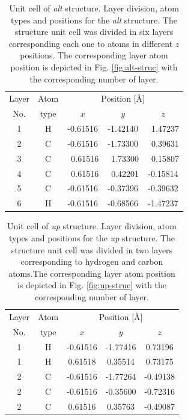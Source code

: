 \documentclass[prb,11pt,tightenlines,twocolumn,aps]{revtex4-1}
\begin{document}
\begin{table}[t]
\center
\begin{tabular}{ccccc}\\
\hline
\quad Layer \quad & \quad Atom \qquad & \multicolumn{3}{c}{Position [\AA]} \\
\cline{3-5}
\quad No.   \quad & \quad type \qquad & $x$ & $y$ & $z$  \\
\hline
1 & H &  -0.61516 &  -1.42140 & \ 1.47237 \\
2 & C &  -0.61516 &  -1.73300 & \ 0.39631 \\
3 & C & \ 0.61516 & \ 1.73300 & \ 0.15807 \\
4 & C & \ 0.61516 & \ 0.42201 &  -0.15814 \\
5 & C &  -0.61516 &  -0.37396 &  -0.39632 \\
6 & H &  -0.61516 &  -0.68566 &  -1.47237 \\
\hline
\end{tabular}

\caption{Unit cell of \emph{alt} structure. Layer division, atom types and
positions for the \emph{alt} structure. The structure unit cell was divided in
six layers corresponding each one to atoms in different $z$ positions. The
corresponding layer atom position is depicted in Fig. \ref{fig:alt-struc} with
the corresponding number of layer.}
\label{tab:alt-unitcell}
\end{table}
% 
\begin{table}[t]
\center
\begin{tabular}{ccccc}\\
\hline
\quad Layer \quad & \quad Atom \qquad & \multicolumn{3}{c}{Position [\AA]} \\
\cline{3-5}
\quad No.   \quad & \quad type \qquad & $x$ & $y$ & $z$  \\
\hline
1 & H & -0.61516 & -1.77416 &  0.73196 \\
1 & H &  0.61518 &  0.35514 &  0.73175 \\
2 & C & -0.61516 & -1.77264 & -0.49138 \\
2 & C & -0.61516 & -0.35600 & -0.72316 \\
2 & C &  0.61516 &  0.35763 & -0.49087 \\
\hline
\end{tabular}

\caption{Unit cell of \emph{up} structure. Layer division, atom types and
positions for the \emph{up} structure. The structure unit cell was divided in
two layers corresponding to hydrogen and carbon atoms.The corresponding layer
atom position is depicted in Fig. \ref{fig:up-struc} with the corresponding
number of layer.}
\label{tab:up-unitcell}
\end{table}
\end{document}
